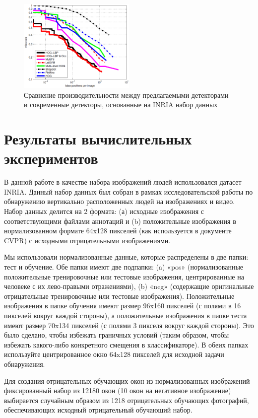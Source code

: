 \documentclass[12pt,twoside]{article}
\begin{document}
\begin{figure}[H]
	\includegraphics[width=0.5\textwidth]{Wang2}
	\caption{Сравнение производительности между предлагаемыми детекторами и современные детекторы, основанные на INRIA набор данных\cite{Wang09}}
	\label{fg:HOG}
\end{figure}

\section{Результаты вычислительных экспериментов}
В данной работе в качестве набора изображений людей использовался датасет INRIA\cite{inria}. Данный набор данных был собран в рамках исследовательской работы по обнаружению вертикально расположенных людей на изображениях и видео\cite{dalaltriggs2005}. Набор данных делится на 2 формата: (а) исходные изображения с соответствующими файлами аннотаций и (b) положительные изображения в нормализованном формате 64x128 пикселей (как используется в документе CVPR) с исходными отрицательными изображениями.

Мы использовали нормализованные данные, которые распределены в две папки: тест и обучение. Обе папки имеют две подпапки: (a) «pos» (нормализованные положительные тренировочные или тестовые изображения, центрированные на человеке с их лево-правыми отражениями), (b) «neg» (содержащие оригинальные отрицательные тренировочные или тестовые изображения). Положительные изображения в папке обучения имеют размер 96x160 пикселей (с полями в 16 пикселей вокруг каждой стороны), а положительные изображения в папке теста имеют размер 70x134 пикселей (с полями 3 пикселя вокруг каждой стороны). Это было сделано, чтобы избежать граничных условий (таким образом, чтобы избежать какого-либо конкретного смещения в классификаторе). В обеих папках используйте центрированное окно 64x128 пикселей для исходной задачи обнаружения.

Для создания отрицательных обучающих окон из нормализованных изображений фиксированный набор из 12180 окон (10 окон на негативное изображение) выбирается случайным образом из 1218 отрицательных обучающих фотографий, обеспечивающих исходный отрицательный обучающий набор.
\end{document}
